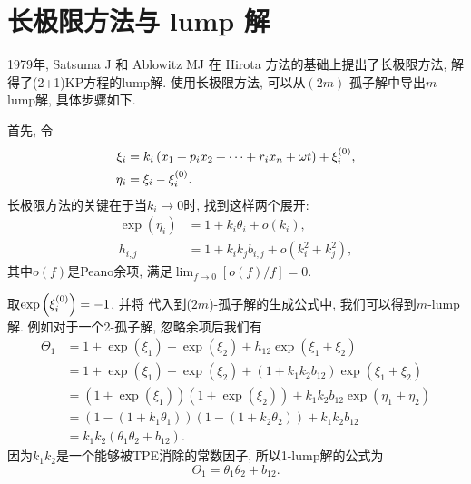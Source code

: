 \section{长极限方法与 lump 解}
1979年, Satsuma J 和 Ablowitz MJ \cite{satsuma1979two} 在 Hirota 方法的基础上提出了长极限方法, 解得了(2+1)KP\cite{kadomtsev1970stability}方程的lump解. 使用长极限方法, 可以从$(2m)$-孤子解中导出$m$-lump解, 具体步骤如下.

首先, 令
\begin{equation}
\begin{split}
    \xi_i&=k_i\left(x_1+p_ix_2+\cdots+r_ix_n+\omega t\right)+\xi_i^{(0)},\\
    \eta_i&=\xi_i-\xi_i^{(0)}.
\end{split}
\end{equation}
长极限方法的关键在于当$k_i\rightarrow 0$时, 找到这样两个展开:
\begin{equation}
\begin{split}
    \exp(\eta_i)&=1+k_i \theta_i+o(k_i), \\ 
    h_{i,j}&=1+k_ik_jb_{i,j}+o(k_i^2+k_j^2),
\end{split} \label{lump-expansion}
\end{equation}
其中$o(f)$是Peano余项, 满足$\lim_{f\rightarrow 0}[o(f)/f]=0$.

取$\exp\left(\xi_i^{(0)}\right)=-1$, 并将 代入到($2m$)-孤子解的生成公式中, 我们可以得到$m$-lump解. 例如对于一个2-孤子解, 忽略余项后我们有
\begin{equation}
\begin{split}
\Theta_1&=1+\exp(\xi_1)+\exp(\xi_2)+h_{12}\exp(\xi_1+\xi_2) \\ 
&= 1+\exp(\xi_1)+\exp(\xi_2)+(1+k_1k_2b_{12})\exp(\xi_1+\xi_2) \\ 
&=(1+\exp(\xi_1))(1+\exp(\xi_2))+k_1k_2b_{12}\exp(\eta_1+\eta_2) \\ 
&=(1-(1+k_1\theta_1))(1-(1+k_2\theta_2))+k_1k_2b_{12} \\
&=k_1k_2(\theta_1\theta_2+b_{12}).
\end{split}
\end{equation}
因为$k_1k_2$是一个能够被TPE消除的常数因子, 所以1-lump解的公式为
\begin{equation}
    \Theta_1=\theta_1\theta_2+b_{12}.
\end{equation}

